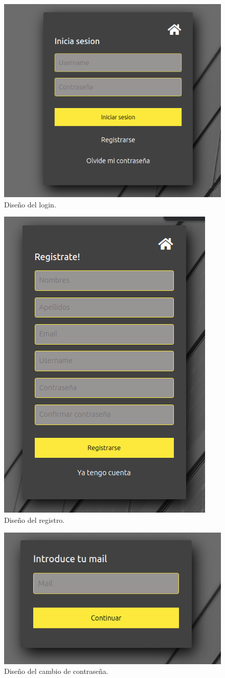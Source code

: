 \begin{figure}[H]
    \centering
    \includegraphics[width=0.60\linewidth]{web/Captura desde 2023-10-16 21-28-23.png}
    \caption{Diseño del login.}
    \label{fig:enter-label}
\end{figure}

\begin{figure}[H]
    \centering
    \includegraphics[width=0.5\linewidth]{web/Captura desde 2023-10-16 21-28-51.png}
    \caption{Diseño del registro.}
    \label{fig:enter-label}
\end{figure}

\begin{figure}[H]
    \centering
    \includegraphics[width=1\linewidth]{web/Captura desde 2023-10-15 23-44-54.png}
    \caption{Diseño del cambio de contraseña.}
    \label{fig:enter-label}
\end{figure}


